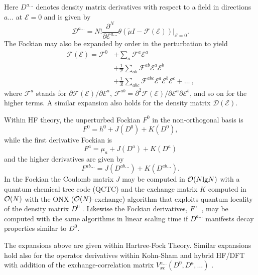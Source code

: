 \documentclass[prl,aps,letterpaper,twocolumn,showpacs,twocolumngrid,superbib]{revtex4}
\def\F{\mathcal{F}}
\def\D{\mathcal{D}}
\def\E{\mathcal{E}}
\begin{document}
Here $D^{a\ldots}$ denotes density matrix derivatives with respect to a field in directions $a\ldots$ 
at $\mathcal{E} = 0$ and is given by 
\begin{equation}
 \displaystyle\D^{a\ldots}=N!
 \frac{\partial^N}{\partial\E^{a\ldots}}\theta(\tilde{\mu}I-
 \F(\E))\bigg|_{\E=0} \label{DDeriv1}.
\end{equation}
 The Fockian may also be expanded by order in the perturbation to yield
\begin{equation}\label{FockianTaylor}
  \begin{split}
    \F(\E)=\F^{0} & +\sum_a \F^{a}\E^{a}\\
    &+\frac{1}{2!}\sum_{ab} \F^{ab}\E^{a}\E^{b}\\
    &+\frac{1}{3!}\sum_{abc} \F^{abc}\E^{a}\E^{b}\E^{c}+\dots ~,
  \end{split}
\end{equation}
where $\F^{a}$ stands for $\partial\F(\E)/\partial\E^{a}$,
$\F^{ab}=\partial^2\F(\E)/\partial\E^{a}\partial\E^{b}$,
and so on for the higher terms.
A similar expansion also holds for the density matrix $\D(\E)$.

Within HF theory, the unperturbed Fockian $F^0$ in the non-orthogonal 
basis is 
\begin{equation}
F^0=h^0+J(D^0)+K(D^0), 
\end{equation}
while the first derivative Fockian is 
\begin{equation}
F^a=\mu_a+J(D^a)+K(D^a)
\end{equation}
and the higher derivatives are given by 
\begin{equation}
F^{ab\ldots}=J(D^{ab\ldots})+K(D^{ab\ldots}). 
\end{equation}
In the Fockian the Coulomb matrix $J$ may be computed in ${\cal O}(N{\rm lg}N)$ 
with a quantum chemical tree code (QCTC) \cite{MChallacombe97} and the
exchange matrix $K$ computed in ${\cal O}(N)$ with the ONX (${\cal O}(N)$-exchange) algorithm 
that exploits quantum locality of the density matrix $D^0$ \cite{ESchwegler97}.
Likewise the Fockian derivatives, $F^{a\ldots}$, may be computed 
with the same algorithms in linear scaling time if 
$D^{a\ldots}$ manifests decay properties similar to $D^0$. 

The expansions above are given within Hartree-Fock Theory. 
Similar expansions hold also for the operator derivatives 
within Kohn-Sham and hybrid HF/DFT with addition of 
the exchange-correlation matrix $V_{xc}^{a\ldots}(D^0,D^a,\ldots)$ 
\cite{Lee_1994,PSalek02}.
\end{document}
